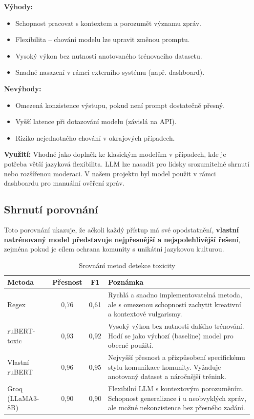 \documentclass[FM,Proj]{tulthesis}
\begin{document}
\textbf{Výhody:}
\begin{itemize}
\item Schopnost pracovat s kontextem a porozumět významu zpráv.
\item Flexibilita – chování modelu lze upravit změnou promptu.
\item Vysoký výkon bez nutnosti anotovaného trénovacího datasetu.
\item Snadné nasazení v rámci externího systému (např. dashboard).
\end{itemize}

\textbf{Nevýhody:}
\begin{itemize}
\item Omezená konzistence výstupu, pokud není prompt dostatečně přesný.
\item Vyšší latence při dotazování modelu (závislá na API).
\item Riziko nejednotného chování v okrajových případech.
\end{itemize}

\textbf{Využití:}
Vhodné jako doplněk ke klasickým modelům v případech, kde je potřeba větší jazyková flexibilita. LLM lze nasadit pro lidsky srozumitelné shrnutí nebo rozšířenou moderaci. V našem projektu byl model použit v rámci dashboardu pro manuální ověření zpráv.

\subsection{Shrnutí porovnání}

Toto porovnání ukazuje, že ačkoli každý přístup má své opodstatnění, \textbf{vlastní natrénovaný model představuje nejpřesnější a nejspolehlivější řešení}, zejména pokud je cílem ochrana komunity s unikátní jazykovou kulturou.

\begin{table}[H]
\centering
\caption{Srovnání metod detekce toxicity}
\begin{tabular}{|l|c|c|p{8.5cm}|}
\hline
\textbf{Metoda} & \textbf{Přesnost} & \textbf{F1} & \textbf{Poznámka} \\
\hline
Regex & 0{,}76 & 0{,}61 & Rychlá a snadno implementovatelná metoda, 
ale s omezenou schopností zachytit kreativní a kontextové vulgarismy. \\
ruBERT-toxic & 0{,}93 & 0{,}92 & Vysoký výkon bez nutnosti dalšího trénování. 
Hodí se jako výchozí (baseline) model pro obecné použití. \\
Vlastní ruBERT & 0{,}96 & 0{,}95 & Nejvyšší přesnost a přizpůsobení specifickému stylu komunikace komunity. 
Vyžaduje anotovaný dataset a náročnější trénink. \\
Groq (LLaMA3-8B) & 0{,}90 & 0{,}90 & Flexibilní LLM s kontextovým porozuměním. 
Schopnost generalizace i u neobvyklých zpráv, ale možné nekonzistence bez přesného zadání. \\
\hline
\end{tabular}
\label{tab:method-comparison-4models}
\end{table}
\end{document}
